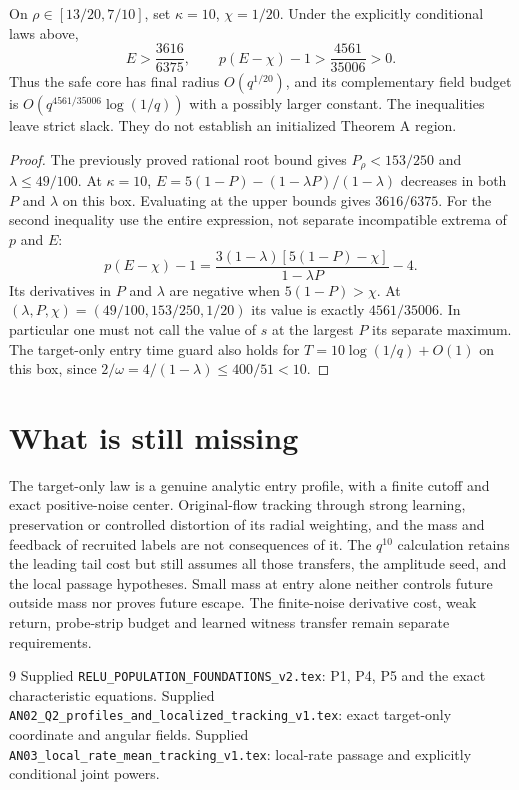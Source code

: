 \documentclass[11pt]{article}
\numberwithin{equation}{section}
\theoremstyle{remark}\newtheorem{remark}[theorem]{Remark}
\begin{document}
\begin{corollary}\label{inc:AN02:profile:v1:rational}
On $\rho\in[13/20,7/10]$, set $\kappa=10$, $\chi=1/20$. Under the explicitly conditional laws above,
\[
 E>\frac{3616}{6375},\qquad
 p(E-\chi)-1>\frac{4561}{35006}>0.
\]
Thus the safe core has final radius $O(q^{1/20})$, and its complementary field budget is $O(q^{4561/35006}\log(1/q))$ with a possibly larger constant. The inequalities leave strict slack. They do not establish an initialized Theorem A region.
\end{corollary}
\begin{proof}
The previously proved rational root bound gives $P_\rho<153/250$ and $\lambda\le49/100$. At $\kappa=10$, $E=5(1-P)-(1-\lambda P)/(1-\lambda)$ decreases in both $P$ and $\lambda$ on this box. Evaluating at the upper bounds gives $3616/6375$.
For the second inequality use the entire expression, not separate incompatible extrema of $p$ and $E$:
\[
 p(E-\chi)-1
 =\frac{3(1-\lambda)[5(1-P)-\chi]}{1-\lambda P}-4.
\]
Its derivatives in $P$ and $\lambda$ are negative when $5(1-P)>\chi$. At $(\lambda,P,\chi)=(49/100,153/250,1/20)$ its value is exactly $4561/35006$. In particular one must not call the value of $s$ at the largest $P$ its separate maximum. The target-only entry time guard also holds for $T=10\log(1/q)+O(1)$ on this box, since $2/\omega=4/(1-\lambda)\le400/51<10$.
\end{proof}

\section{What is still missing}
The target-only law is a genuine analytic entry profile, with a finite cutoff and exact positive-noise center. Original-flow tracking through strong learning, preservation or controlled distortion of its radial weighting, and the mass and feedback of recruited labels are not consequences of it. The $q^{10}$ calculation retains the leading tail cost but still assumes all those transfers, the amplitude seed, and the local passage hypotheses. Small mass at entry alone neither controls future outside mass nor proves future escape. The finite-noise derivative cost, weak return, probe-strip budget and learned witness transfer remain separate requirements.

\begin{thebibliography}{9}\small
{} Supplied \texttt{RELU\_POPULATION\_FOUNDATIONS\_v2.tex}: P1, P4, P5 and the exact characteristic equations.
 Supplied \texttt{AN02\_Q2\_profiles\_and\_localized\_tracking\_v1.tex}: exact target-only coordinate and angular fields.
 Supplied \texttt{AN03\_local\_rate\_mean\_tracking\_v1.tex}: local-rate passage and explicitly conditional joint powers.
\end{thebibliography}
\end{document}
